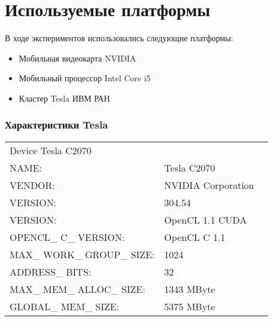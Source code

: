 \documentclass[presentation]{beamer}
\begin{document}
\section{Используемые платформы}
\label{sec-2}
\begin{frame}

В ходе экспериментов использовались следующие платформы:
\begin{itemize}
\item Мобильная видеокарта NVIDIA
\item Мобильный процессор Intel Core i5
\item Кластер Tesla ИВМ РАН
\end{itemize}
\end{frame}
\begin{frame}
\frametitle{Характеристики Tesla}
\label{sec-2-2}


\begin{center}
\begin{tabular}{lll}
 Device Tesla C2070                &                      &     \\
 NAME:                             &  Tesla C2070         &     \\
 VENDOR:                           &  NVIDIA Corporation  &     \\
 VERSION:                          &  304.54              &     \\
 VERSION:                          &  OpenCL 1.1 CUDA     &     \\
 OPENCL\_{} C\_{} VERSION:         &  OpenCL C 1.1        &     \\
 MAX\_{} WORK\_{} GROUP\_{} SIZE:  &  1024                &     \\
 ADDRESS\_{} BITS:                 &  32                  &     \\
 MAX\_{} MEM\_{} ALLOC\_{} SIZE:   &  1343 MByte          &     \\
 GLOBAL\_{} MEM\_{} SIZE:          &  5375 MByte          &     \\
\end{tabular}
\end{center}
\end{frame}
\end{document}
